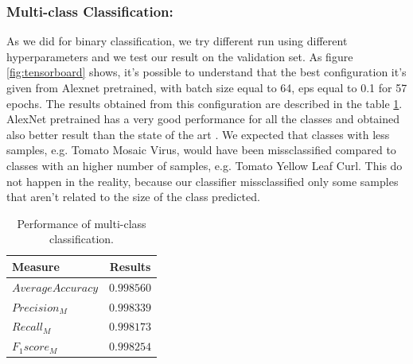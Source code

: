 \subsubsection{Multi-class Classification:}
As we did for binary classification, we try different run using different hyperparameters and we test our result on the validation set. As figure \ref{fig:tensorboard} shows, it's possible to understand that the best configuration it's given from Alexnet pretrained, with batch size equal to 64, eps equal to 0.1 for 57 epochs. The results obtained from this configuration are described in the table \ref{table:multiclass}. AlexNet pretrained has a very good performance for all the classes and obtained also better result than the state of the art \cite{ref11}. We expected that classes with less samples, e.g. Tomato Mosaic Virus, would have been missclassified compared to classes with an higher number of samples, e.g. Tomato Yellow Leaf Curl. This do not happen in the reality, because our classifier missclassified only some samples that aren't related to the size of the class predicted.
\begin{table}[H]
	\begin{center}
		\begin{tabular}{|l|c|}
			\hline
			\textbf{Measure} & \textbf{Results} \\ 
			\hline
			$Average Accuracy$ & $0.998560$ \\
			$Precision_M$ & $0.998339$ \\
			$Recall_M$ & $0.998173$ \\
			$F_1 score_M$ & $0.998254$ \\
			\hline
		\end{tabular}
	\end{center}
	\caption{Performance of multi-class classification.}
	\label{table:multiclass}
\end{table}
